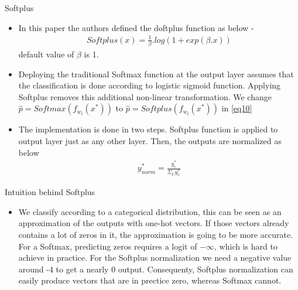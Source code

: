 \documentclass{beamer}
\theoremstyle{remark}
\begin{document}
\begin{frame}{Softplus}
    \begin{itemize}
        \item In this paper the authors defined the doftplus function as below -
        \begin{align*}
            Softplus(x) = \frac{1}{\beta}.log(1+exp(\beta.x))
        \end{align*}
        default value of $\beta$ is 1.
        \item Deploying the traditional Softmax function at the output layer assumes that the classification is done according to logistic sigmoid function. Applying Softplus removes this additional non-linear transformation. We change $\hat{p}=Softmax(f_{w_t}(x^*))$ to $\hat{p}=Softplus(f_{w_t}(x^*))$ in \eqref{eq10}
        \item The implementation is done in two steps. Softplus function is applied to output layer just as any other layer. Then, the outputs are normalized as below
        \begin{align*}
            y_{norm}^* = \frac{y_c^*}{\Sigma_C y_c^*}
        \end{align*}
    \end{itemize}
\end{frame}
\begin{frame}{Intuition behind Softplus}
\begin{itemize}
    \item We classify according to a categorical distribution, this can be seen as an approximation of the outputs with one-hot vectors. If those vectors already contains a lot of zeros in it, the approximation is going to be more accurate. For a Softmax, predicting zeros requires a logit of $-\infty$, which is hard to achieve in practice. For the Softplus normalization we need a negative value around -4 to get a nearly 0 output. Consequenty, Softplus normalization can easily produce vectors that are in prectice zero, whereas Softmax cannot.
\end{itemize}
\end{frame}
\end{document}
